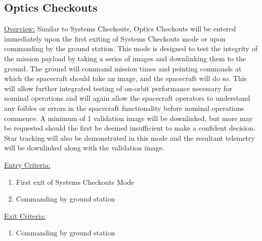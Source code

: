 \documentclass{article}
\begin{document}
\newpage

\subsection{Optics Checkouts}

\underline{Overview:} Similar to Systems Checkouts, Optics Checkouts will be entered immediately upon the first exiting of Systems Checkouts mode or upon commanding by the ground station. This mode is designed to test the integrity of the mission payload by taking a series of images and downlinking them to the ground. The ground will command mission times and pointing commands at which the spacecraft should take an image, and the spacecraft will do so. This will allow further integrated testing of on-orbit performance necessary for nominal operations and will again allow the spacecraft operators to understand any foibles or errors in the spacecraft functionality before nominal operations commence. A minimum of 1 validation image will be downlinked, but more may be requested should the first be deemed insufficient to make a confident decision. Star tracking will also be demonstrated in this mode and the resultant telemetry will be downlinked along with the validation image.

\underline{Entry Criteria:} 

\begin{enumerate}
\item First exit of Systems Checkouts Mode
\item Commanding by ground station
\end{enumerate}

\underline{Exit Criteria:}

\begin{enumerate}
\item Commanding by ground station
\end{enumerate}
\end{document}
